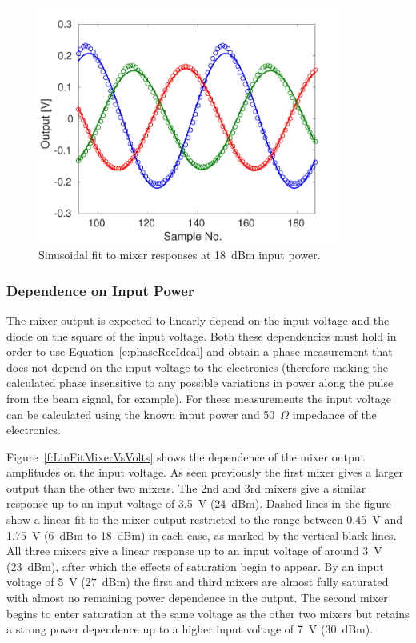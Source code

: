 \begin{figure}
  \centering
  \includegraphics[width=0.9\textwidth]{Figures/phaseMons/mixersFit18dBm}
  \caption{Sinusoidal fit to mixer responses at 18~dBm input power.}
  \label{f:mixersFit18dBm}
\end{figure}

\subsubsection{Dependence on Input Power}

The mixer output is expected to linearly depend on the input voltage and the diode on the square of the input voltage. Both these dependencies must hold in order to use Equation~\ref{e:phaseRecIdeal} and obtain a phase measurement that does not depend on the input voltage to the electronics (therefore making the calculated phase insensitive to any possible variations in power along the pulse from the beam signal, for example). For these measurements the input voltage can be calculated using the known input power and 50~\(\Omega\) impedance of the electronics.

Figure~\ref{f:LinFitMixerVsVolts} shows the dependence of the mixer output amplitudes on the input voltage. As seen previously the first mixer gives a larger output than the other two mixers. The 2nd and 3rd mixers give a similar response up to an input voltage of 3.5~V (24~dBm). Dashed lines in the figure show a linear fit to the mixer output restricted to the range between 0.45~V and 1.75~V (6~dBm to 18~dBm) in each case, as marked by the vertical black lines. All three mixers give a linear response up to an input voltage of around 3~V (23~dBm), after which the effects of saturation begin to appear. By an input voltage of 5~V (27~dBm) the first and third mixers are almost fully saturated with almost no remaining power dependence in the output. The second mixer begins to enter saturation at the same voltage as the other two mixers but retains a strong power dependence up to a higher input voltage of 7~V (30~dBm).

